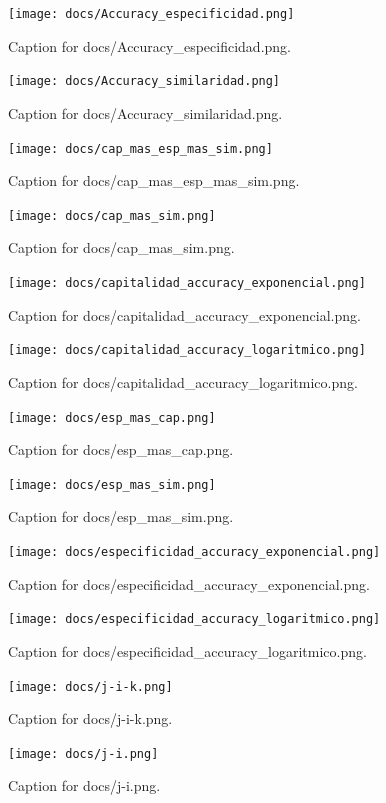 \documentclass{article}
\begin{document}
\begin{figure}[h] \centering \texttt{[image: docs/Accuracy\_especificidad.png]} \caption{Caption for docs/Accuracy_especificidad.png.} \end{figure}
\begin{figure}[h] \centering \texttt{[image: docs/Accuracy\_similaridad.png]} \caption{Caption for docs/Accuracy_similaridad.png.} \end{figure}
\begin{figure}[h] \centering \texttt{[image: docs/cap\_mas\_esp\_mas\_sim.png]} \caption{Caption for docs/cap_mas_esp_mas_sim.png.} \end{figure}
\begin{figure}[h] \centering \texttt{[image: docs/cap\_mas\_sim.png]} \caption{Caption for docs/cap_mas_sim.png.} \end{figure}
\begin{figure}[h] \centering \texttt{[image: docs/capitalidad\_accuracy\_exponencial.png]} \caption{Caption for docs/capitalidad_accuracy_exponencial.png.} \end{figure}
\begin{figure}[h] \centering \texttt{[image: docs/capitalidad\_accuracy\_logaritmico.png]} \caption{Caption for docs/capitalidad_accuracy_logaritmico.png.} \end{figure}
\begin{figure}[h] \centering \texttt{[image: docs/esp\_mas\_cap.png]} \caption{Caption for docs/esp_mas_cap.png.} \end{figure}
\begin{figure}[h] \centering \texttt{[image: docs/esp\_mas\_sim.png]} \caption{Caption for docs/esp_mas_sim.png.} \end{figure}
\begin{figure}[h] \centering \texttt{[image: docs/especificidad\_accuracy\_exponencial.png]} \caption{Caption for docs/especificidad_accuracy_exponencial.png.} \end{figure}
\begin{figure}[h] \centering \texttt{[image: docs/especificidad\_accuracy\_logaritmico.png]} \caption{Caption for docs/especificidad_accuracy_logaritmico.png.} \end{figure}
\begin{figure}[h] \centering \texttt{[image: docs/j-i-k.png]} \caption{Caption for docs/j-i-k.png.} \end{figure}
\begin{figure}[h] \centering \texttt{[image: docs/j-i.png]} \caption{Caption for docs/j-i.png.} \end{figure}
\end{document}
